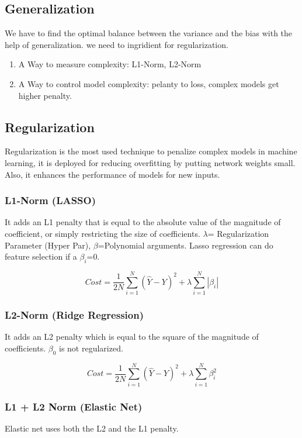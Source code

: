 \subsection{Generalization}
We have to find the optimal balance between the variance and the bias with the help of generalization. we need to ingridient for regularization.
\begin{enumerate}
  \itemsep -0.5em
  \item A Way to measure complexity: L1-Norm, L2-Norm
  \item A Way to control model complexity: pelanty to loss, complex models get higher penalty.
\end{enumerate}

\subsection{Regularization}
Regularization is the most used technique to penalize complex models in machine learning, it is deployed for reducing overfitting by putting network weights small. Also, it enhances the performance of models for new inputs.

\subsubsection{L1-Norm (LASSO)}
It adds an L1 penalty that is equal to the absolute value of the magnitude of coefficient, or simply restricting the size of coefficients.
$\lambda$= Regularization Parameter (Hyper Par), $\beta$=Polynomial arguments. Lasso regression can do feature selection if a $\beta_{i}$=0.

\[ Cost = \frac{1}{2N} \sum_{i=1}^N (\hat{Y}-Y)^2 + \lambda \sum_{i=1}^N |\beta_{i}| \]

\subsubsection{L2-Norm (Ridge Regression)}
It adds an L2 penalty which is equal to the square of the magnitude of coefficients. $\beta_{0}$ is not regularized.

\[ Cost = \frac{1}{2N} \sum_{i=1}^N (\hat{Y}-Y)^2 + \lambda \sum_{i=1}^N \beta_{i}^2 \]


\subsubsection{L1 + L2 Norm (Elastic Net)}
Elastic net uses both the L2 and the L1 penalty. 



